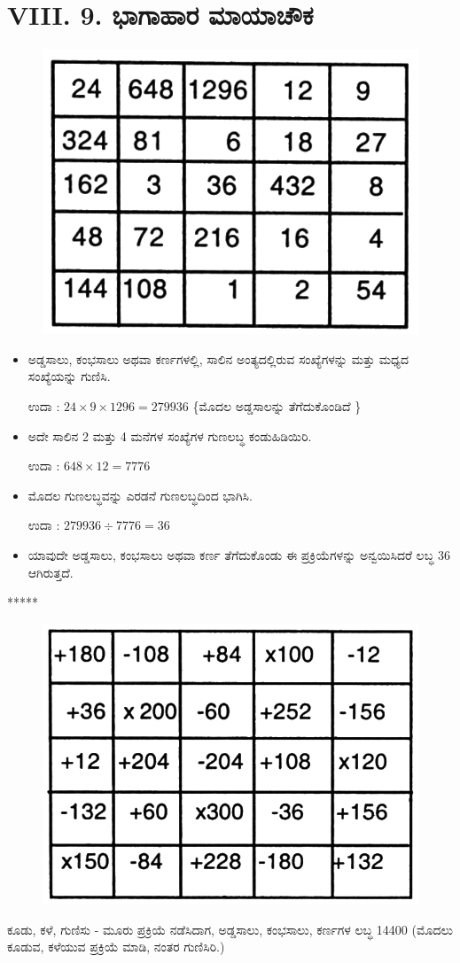 \section*{VIII. 9. ಭಾಗಾಹಾರ ಮಾಯಾಚೌಕ}

\begin{figure}[H]
\includegraphics{src/figures/chap7/fig7-31.jpg}
\end{figure}
\begin{itemize}
	\item ಅಡ್ಡಸಾಲು, ಕಂಭಸಾಲು ಅಥವಾ ಕರ್ಣಗಳಲ್ಲಿ, ಸಾಲಿನ ಅಂತ್ಯದಲ್ಲಿರುವ ಸಂಖ್ಯೆಗಳನ್ನು ಮತ್ತು ಮಧ್ಯದ ಸಂಖ್ಯೆಯನ್ನು ಗುಣಿಸಿ.

	ಉದಾ : $24 \times 9 \times 1296=279936$ \{ಮೊದಲ ಅಡ್ಡಸಾಲನ್ನು ತೆಗೆದುಕೊಂಡಿದೆ \} 
	\item ಅದೇ ಸಾಲಿನ 2 ಮತ್ತು 4 ಮನೆಗಳ ಸಂಖ್ಯೆಗಳ ಗುಣಲಬ್ಧ ಕಂಡುಹಿಡಿಯಿರಿ.
	
	ಉದಾ : $648 \times 12=7776$
	\item ಮೊದಲ ಗುಣಲಬ್ಧವನ್ನು ಎರಡನೆ ಗುಣಲಬ್ಧದಿಂದ ಭಾಗಿಸಿ.

	ಉದಾ : $279936 \div 7776 = \boxed{36}$
	\item ಯಾವುದೇ ಅಡ್ಡಸಾಲು, ಕಂಭಸಾಲು ಅಥವಾ ಕರ್ಣ ತೆಗೆದುಕೊಂಡು ಈ ಪ್ರಕ್ರಿಯೆಗಳನ್ನು ಅನ್ವಯಿಸಿದರೆ ಲಬ್ಧ 36 ಆಗಿರುತ್ತದೆ.
\end{itemize}

\begin{center}
*****
\end{center}

\begin{figure}[H]
\includegraphics{src/figures/chap7/fig7-32.jpg}
\end{figure}
ಕೂಡು, ಕಳೆ, ಗುಣಿಸು - ಮೂರು ಪ್ರಕ್ರಿಯೆ ನಡೆಸಿದಾಗ, ಅಡ್ಡಸಾಲು, ಕಂಭಸಾಲು, ಕರ್ಣಗಳ ಲಬ್ಧ 14400 (ಮೊದಲು ಕೂಡುವ, ಕಳೆಯುವ ಪ್ರಕ್ರಿಯೆ ಮಾಡಿ, ನಂತರ ಗುಣಿಸಿರಿ.)
